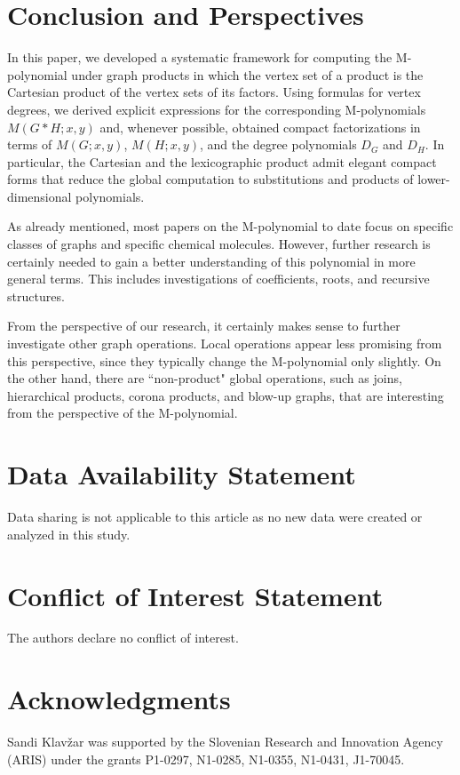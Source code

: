 \documentclass[letterpaper,12pt]{article}
\begin{document}
\section{Conclusion and Perspectives}
\label{sec:Conclusion}

In this paper, we developed a systematic framework for computing the M-polynomial under graph products in which the vertex set of a product is the Cartesian product of the vertex sets of its factors. Using formulas for vertex degrees, we derived explicit expressions for the corresponding M-polynomials $M(G\ast H;x,y)$ and, whenever possible, obtained compact factorizations in terms of $M(G;x,y)$, $M(H;x,y)$, and the degree polynomials $D_G$ and $D_H$. In particular, the Cartesian and the lexicographic product admit elegant compact forms that reduce the global computation to substitutions and products of lower-dimensional polynomials.

As already mentioned, most papers on the M-polynomial to date focus on specific classes of graphs and specific chemical molecules. However, further research is certainly needed to gain a better understanding of this polynomial in more general terms. This includes investigations of coefficients, roots, and recursive structures. 

From the perspective of our research, it certainly makes sense to further investigate other graph operations. Local operations appear less promising from this perspective, since they typically change the M-polynomial only slightly. On the other hand, there are ``non-product" global operations, such as joins, hierarchical products, corona products, and blow-up graphs, that are interesting from the perspective of the M-polynomial. 

\section*{Data Availability Statement}
 
Data sharing is not applicable to this article as no new data were created or analyzed in this study.

\section*{Conflict of Interest Statement}

The authors declare no conflict of interest.
 

\section*{Acknowledgments}

Sandi Klav\v{z}ar was supported by the Slovenian Research and Innovation Agency (ARIS) under the grants P1-0297, N1-0285, N1-0355, N1-0431, J1-70045.  

 
%  

\end{document}
